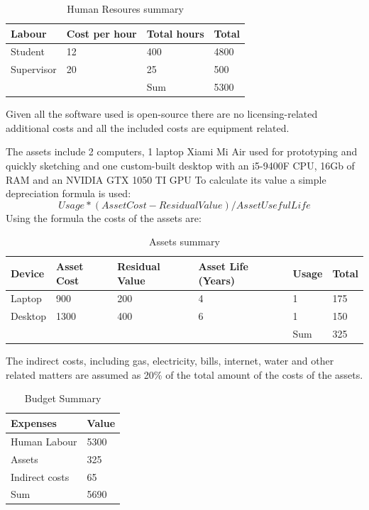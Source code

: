 \begin{table}[h!]
    \centering
    \begin{tabular}{l l l l} 
        \hline
        Labour & Cost per hour & Total hours & Total \\ [0.5ex] 
        \hline
        Student & 12 & 400 & 4800 \\ 
        Supervisor & 20 & 25 & 500 \\
        \hline
        & & Sum & 5300 \\
        \hline
    \end{tabular}
    \caption{Human Resoures summary}
    \label{table:Human Resources summary}
\end{table}

Given all the software used is open-source there are no licensing-related additional costs and all the included costs are equipment related.

The assets include 2 computers, 1 laptop Xiami Mi Air used for prototyping and quickly sketching and one custom-built desktop with an i5-9400F CPU, 16Gb of RAM and an NVIDIA GTX 1050 TI GPU 
To calculate its value a simple depreciation formula is used:
$$Usage *  (Asset Cost - Residual Value) / Asset Useful Life$$
Using the formula the costs of the assets are:
\begin{table}[h!]
    \centering
    \begin{tabular}{l l l l l l} 
        \hline
        Device & Asset Cost & Residual Value & Asset Life (Years) & Usage & Total \\ [0.5ex] 
        \hline
        Laptop & 900 & 200 &  4 & 1 & 175 \\ 
        Desktop & 1300 & 400 & 6 & 1 & 150 \\
        \hline
        & & & & Sum & 325 \\
        \hline
    \end{tabular}
    \caption{Assets summary}
    \label{table:2}
\end{table}

The indirect costs, including gas, electricity, bills, internet, water and other related matters are assumed as 20\% of the total amount of the costs of the assets.

\begin{table}[h!]
    \centering
    \begin{tabular}{l l} 
        \hline
        Expenses & Value \\
        \hline
        Human Labour & 5300 \\ 
        Assets & 325 \\
        Indirect costs & 65 \\
        \hline
        Sum & 5690 \\
        \hline
    \end{tabular}
    \caption{Budget Summary}
    \label{table:Budget Summary}
\end{table}
\newpage


